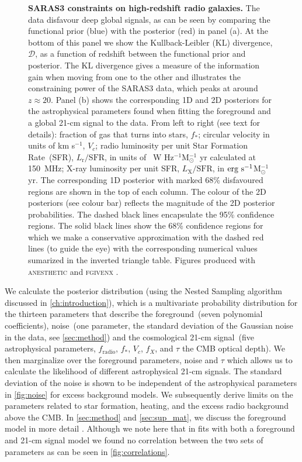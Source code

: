 \begin{figure}
   \caption{\textbf{SARAS3 constraints on high-redshift radio galaxies.} The data disfavour deep global signals, as can be seen by comparing the functional prior (blue) with the posterior (red) in panel (a). At the bottom of this panel we show the Kullback-Leibler (KL) divergence, $\mathcal{D}$, as a function of redshift between the functional prior and posterior. The KL divergence gives a measure of the information gain when moving from one to the other and illustrates the constraining power of the SARAS3 data, which peaks at around $z\approx20$. Panel (b) shows the corresponding 1D and 2D posteriors for the astrophysical parameters found when fitting the foreground and a global 21-cm signal to the data. From left to right (see text for details): fraction of gas that turns into stars, $f_*$;  circular velocity in units of km s$^{-1}$, $V_c$; radio luminosity per unit Star Formation Rate~(SFR), $L_\mathrm{r}/\mathrm{SFR}$, in units of ~W Hz$^{-1}$M$_\odot^{-1}$ yr calculated at 150~MHz; X-ray luminosity per unit SFR, $L_\mathrm{X}/\mathrm{SFR}$,  in $\textnormal{erg~s}^{-1}$M$_\odot^{-1}$ yr. The corresponding 1D posterior with marked 68\% disfavoured regions are shown in the top of each column. The colour of the 2D posteriors (see colour bar) reflects the magnitude of the 2D posterior probabilities. The dashed black lines encapsulate the 95\% confidence regions. The solid black lines show the 68\% confidence regions for which we make a conservative approximation with the dashed red lines (to guide the eye) with the corresponding numerical values sumarized in the inverted triangle table. Figures produced with \textsc{anesthetic} \protect\cite{anesthetic} and \textsc{fgivenx} \protect\cite{fgivenx}.} 
    \label{fig:fradio_results}
\end{figure}

We calculate the posterior distribution (using the Nested Sampling algorithm  discussed in \cref{ch:introduction}), which is a multivariate probability distribution for the thirteen parameters that describe the foreground~(seven polynomial coefficients), noise~(one parameter, the standard deviation of the Gaussian noise in the data, see \cref{sec:method}) and the cosmological 21-cm signal~(five astrophysical parameters, $f_\mathrm{radio}$, $f_*$, $V_c$, $f_X$, and $\tau$ the CMB optical depth). We then marginalize over the foreground parameters, noise and $\tau$ which allows us to calculate the likelihood of different astrophysical 21-cm signals. The standard deviation of the noise is shown to be independent of the astrophysical parameters in \cref{fig:noise} for excess background models. We subsequently derive limits on the parameters related to star formation, heating, and the excess radio background above the CMB. In \cref{sec:method} and \cref{sec:sup_mat}, we discuss the foreground model in more detail \cite{SARAS3}. Although we note here that in fits with both a foreground and 21-cm signal model we found no correlation between the two sets of parameters as can be seen in \cref{fig:correlations}.


